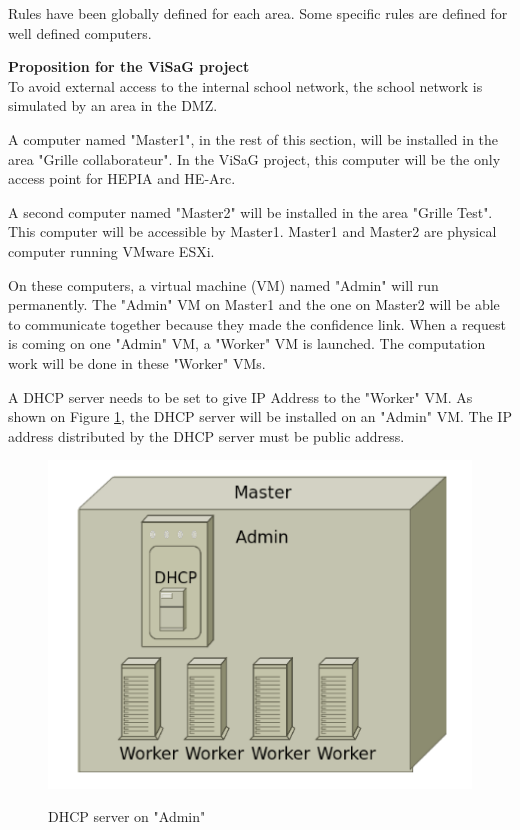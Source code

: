 Rules have been globally defined for each area. Some specific rules are defined for well defined computers. 

\textbf{Proposition for the ViSaG project}\\
To avoid external access to the internal school network, the school network is simulated by an area in the DMZ. \s

A computer named "Master1", in the rest of this section, will be installed in the area "Grille collaborateur". In the ViSaG project, this computer will be the only access point for HEPIA and HE-Arc. \s

A second computer named "Master2" will be installed in the area "Grille Test". This computer will be accessible by Master1. Master1 and Master2 are physical computer running VMware ESXi.\s

On these computers, a virtual machine (VM) named "Admin" will run permanently. The "Admin" VM on Master1 and the one on Master2 will be able to communicate together because they made the confidence link.
When a request is coming on one "Admin" VM, a "Worker" VM is launched. The computation work will be done in these "Worker" VMs.\s

\pagebreak
A DHCP server needs to be set to give IP Address to the "Worker" VM. As shown on Figure \ref{fig:dmz_dhcp1}, the DHCP server will be installed on an "Admin" VM. The IP address distributed by the DHCP server must be public address.

\begin{figure}[ht]
	\caption{DHCP server on "Admin"}
  	\centering
	\includegraphics[scale=0.6]{./pic/dmz2.png}
	\label{fig:dmz_dhcp1}
\end{figure}

